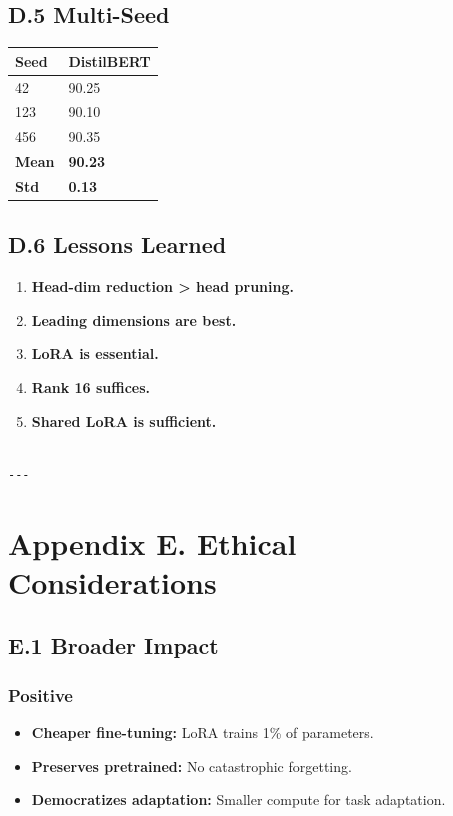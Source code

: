\subsection{D.5 Multi-Seed}

\begin{table}[H]
\centering
\small
\begin{tabular}{ll}
\toprule
\textbf{Seed} & \textbf{DistilBERT} \\
\midrule
42 & 90.25 \\
123 & 90.10 \\
456 & 90.35 \\
\textbf{Mean} & \textbf{90.23} \\
\textbf{Std} & \textbf{0.13} \\
\bottomrule
\end{tabular}
\end{table}

\subsection{D.6 Lessons Learned}

\begin{enumerate}
\item \textbf{Head-dim reduction > head pruning.}
\item \textbf{Leading dimensions are best.}
\item \textbf{LoRA is essential.}
\item \textbf{Rank 16 suffices.}
\item \textbf{Shared LoRA is sufficient.}
\end{enumerate}
\begin{lstlisting}

---
\end{lstlisting}


\section{Appendix E. Ethical Considerations}

\subsection{E.1 Broader Impact}

\subsubsection{Positive}
\begin{itemize}
\item \textbf{Cheaper fine-tuning:} LoRA trains 1\% of parameters.
\item \textbf{Preserves pretrained:} No catastrophic forgetting.
\item \textbf{Democratizes adaptation:} Smaller compute for task adaptation.

\end{itemize}
